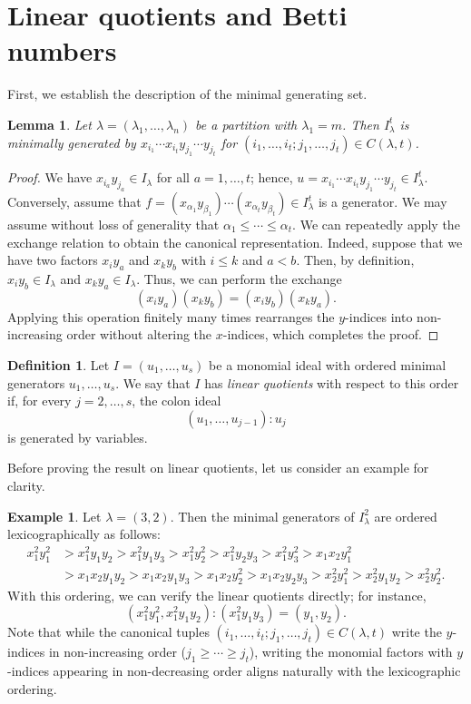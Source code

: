 \documentclass[12pt,amscd]{amsart}
\newtheorem{lem}[thm]{Lemma}
\theoremstyle{definition}
\newtheorem{defn}[thm]{Definition}
\newtheorem{exam}[thm]{Example}
\numberwithin{equation}{section}
\begin{document}
\section{Linear quotients and Betti numbers}
First, we establish the description of the minimal generating set.

\begin{lem}\label{lem:gens} 
Let $\lambda = (\lambda_1,\ldots, \lambda_n)$ be a partition with $\lambda_1 = m$. Then $I_\lambda^t$ is minimally generated by $x_{i_1}\cdots x_{i_t} y_{j_1} \cdots y_{j_t}$ for $(i_1, \ldots, i_t; j_1, \ldots, j_t) \in C(\lambda,t)$.
\end{lem}

\begin{proof} 
We have $x_{i_a} y_{j_a} \in I_\lambda$ for all $a = 1,\ldots,t$; hence, $u = x_{i_1} \cdots x_{i_t} y_{j_1} \cdots y_{j_t} \in I_\lambda^t$. Conversely, assume that $f = (x_{\alpha_1}y_{\beta_1}) \cdots (x_{\alpha_t}y_{\beta_t}) \in I_\lambda^t$ is a generator. We may assume without loss of generality that $\alpha_1 \le \cdots \le \alpha_t$. We can repeatedly apply the exchange relation to obtain the canonical representation. Indeed, suppose that we have two factors $x_i y_a$ and $x_k y_b$ with $i \le k$ and $a < b$. Then, by definition, $x_i y_b \in I_\lambda$ and $x_k y_a \in I_\lambda$. Thus, we can perform the exchange 
\[
(x_i y_a) (x_k y_b) = (x_i y_b) (x_k y_a).
\]
Applying this operation finitely many times rearranges the $y$-indices into non-increasing order without altering the $x$-indices, which completes the proof.
\end{proof}

\begin{defn}
Let $I=(u_1,\ldots,u_s)$ be a monomial ideal with ordered minimal generators $u_1,\ldots,u_s$. We say that $I$ has \emph{linear quotients} with respect to this order if, for every $j=2,\ldots,s$, the colon ideal
\[
(u_1,\ldots,u_{j-1}):u_j
\]
is generated by variables.
\end{defn}

Before proving the result on linear quotients, let us consider an example for clarity.

\begin{exam} 
Let $\lambda = (3,2)$. Then the minimal generators of $I_\lambda^2$ are ordered lexicographically as follows:
\[
\begin{aligned}
x_1^2 y_1^2 &> x_1^2y_1y_2 > x_1^2 y_1 y_3 > x_1^2y_2^2 > x_1^2y_2y_3 > x_1^2y_3^2 > x_1x_2y_1^2 \\
&> x_1x_2y_1y_2 > x_1x_2y_1y_3 > x_1x_2y_2^2 > x_1x_2y_2y_3 > x_2^2 y_1^2 > x_2^2 y_1y_2 > x_2^2 y_2^2.
\end{aligned}
\]
With this ordering, we can verify the linear quotients directly; for instance,
\[
(x_1^2y_1^2, x_1^2y_1y_2) : (x_1^2y_1y_3) = (y_1, y_2).
\]
Note that while the canonical tuples $(i_1, \ldots, i_t; j_1, \ldots, j_t) \in C(\lambda, t)$ write the $y$-indices in non-increasing order ($j_1 \ge \cdots \ge j_t$), writing the monomial factors with $y$-indices appearing in non-decreasing order aligns naturally with the lexicographic ordering.
\end{exam}
\end{document}
